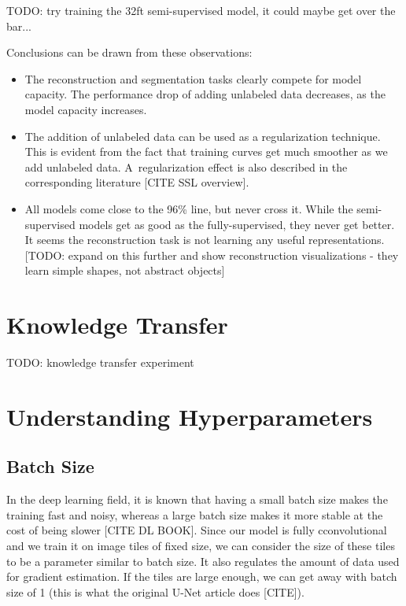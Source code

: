 TODO: try training the 32ft semi-supervised model, it could maybe get over the bar...

Conclusions can be drawn from these observations:

\begin{itemize}
    \item The reconstruction and segmentation tasks clearly compete for model capacity. The performance drop of adding unlabeled data decreases, as the model capacity increases.
    \item The addition of unlabeled data can be used as a regularization technique. This is evident from the fact that training curves get much smoother as we add unlabeled data. A~regularization effect is also described in the corresponding literature [CITE SSL overview].
    \item All models come close to the 96\% line, but never cross it. While the semi-supervised models get as good as the fully-supervised, they never get better. It seems the reconstruction task is not learning any useful representations. [TODO: expand on this further and show reconstruction visualizations - they learn simple shapes, not abstract objects]
\end{itemize}



\section{Knowledge Transfer}
\label{sec:KnowledgeTransfer}

TODO: knowledge transfer experiment


\section{Understanding Hyperparameters}
\label{sec:UnderstandingHyperparameters}


\subsection{Batch Size}
\label{sec:BatchSize}

In the deep learning field, it is known that having a small batch size makes the training fast and noisy, whereas a large batch size makes it more stable at the cost of being slower [CITE DL BOOK]. Since our model is fully cconvolutional and we train it on image tiles of fixed size, we can consider the size of these tiles to be a parameter similar to batch size. It also regulates the amount of data used for gradient estimation. If the tiles are large enough, we can get away with batch size of 1 (this is what the original U-Net article does [CITE]).

